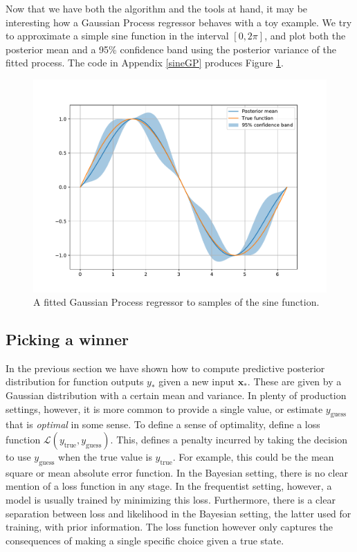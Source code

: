 \documentclass[10pt,a4paper,twoside]{book}
\begin{document}
Now that we have both the algorithm and the tools at hand, it may be interesting how a Gaussian Process regressor behaves with a toy example. We try to approximate a simple sine function in the interval $[0, 2\pi]$, and plot both the posterior mean and a 95\% confidence band using the posterior variance of the fitted process. The code in Appendix \ref{sineGP} produces Figure \ref{fig:GPsine}.\\


\begin{figure}
\caption{A fitted Gaussian Process regressor to samples of the sine function.}
\label{fig:GPsine}
\includegraphics[width=\textwidth]{figures/chapter2/GPsine}
\end{figure}

\subsection{Picking a winner}

In the previous section we have shown how to compute predictive posterior distribution for function outputs $y_*$ given a new input $\boldsymbol{x}_*$. These are given by a Gaussian distribution with a certain mean and variance. In plenty of production settings, however, it is more common to provide a single value, or estimate $y_{\mathrm{guess}}$ that is \textit{optimal} in some sense. To define a sense of optimality, define a loss function $\mathcal{L}(y_{\mathrm{true}}, y_{\mathrm{guess}})$. This, defines a penalty incurred by taking the decision to use $y_{\mathrm{guess}}$ when the true value is $y_{\mathrm{true}}$. For example, this could be the mean square or mean absolute error function. In the Bayesian setting, there is no clear mention of a loss function in any stage. In the frequentist setting, however, a model is usually trained by minimizing this loss. Furthermore, there is a clear separation between loss and likelihood in the Bayesian setting, the latter used for training, with prior information. The loss function however only captures the consequences of making a single specific choice given a true state.\\
\end{document}

